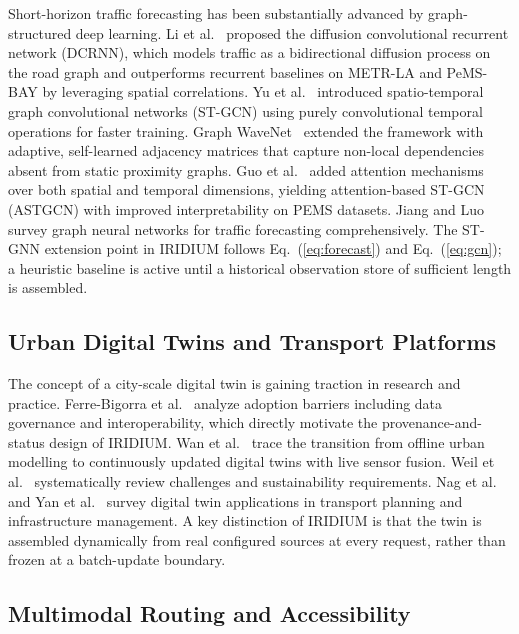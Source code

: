 Short-horizon traffic forecasting has been substantially advanced by
graph-structured deep learning.
Li et al.\ \cite{li2018dcrnn} proposed the diffusion convolutional recurrent
network (DCRNN), which models traffic as a bidirectional diffusion process
on the road graph and outperforms recurrent baselines on METR-LA and
PeMS-BAY by leveraging spatial correlations.
Yu et al.\ \cite{yu2018stgcn} introduced spatio-temporal graph convolutional
networks (ST-GCN) using purely convolutional temporal operations for
faster training.
Graph WaveNet~\cite{wu2019graphwavenet} extended the framework with
adaptive, self-learned adjacency matrices that capture non-local dependencies
absent from static proximity graphs.
Guo et al.\ \cite{guo2019astgcn} added attention mechanisms over both spatial
and temporal dimensions, yielding attention-based ST-GCN (ASTGCN) with
improved interpretability on PEMS datasets.
Jiang and Luo~\cite{jiang2022gnn_survey} survey graph neural networks for
traffic forecasting comprehensively.
The ST-GNN extension point in IRIDIUM follows Eq.~(\ref{eq:forecast})
and Eq.~(\ref{eq:gcn}); a heuristic baseline is active until a historical
observation store of sufficient length is assembled.

\subsection{Urban Digital Twins and Transport Platforms}

The concept of a city-scale digital twin is gaining traction in research
and practice.
Ferre-Bigorra et al.\ \cite{ferrebigorra2022urban_digital_twins} analyze
adoption barriers including data governance and interoperability, which
directly motivate the provenance-and-status design of IRIDIUM.
Wan et al.\ \cite{wan2024urban_modelling_to_city_digital_twins} trace the
transition from offline urban modelling to continuously updated digital
twins with live sensor fusion.
Weil et al.\ \cite{weil2023urban_digital_twin_challenges} systematically
review challenges and sustainability requirements.
Nag et al.\ \cite{nag2025digital_twins_transport_planning} and
Yan et al.\ \cite{yan2023digital_twin_transport_infra} survey digital
twin applications in transport planning and infrastructure management.
A key distinction of IRIDIUM is that the twin is assembled dynamically from
real configured sources at every request, rather than frozen at a
batch-update boundary.

\subsection{Multimodal Routing and Accessibility}

